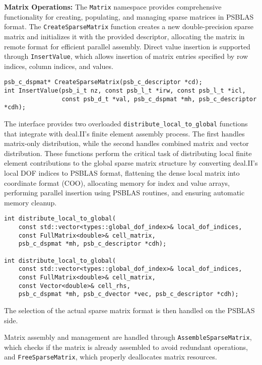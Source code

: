 \documentclass[a4paper,12pt]{article}
\begin{document}
\textbf{Matrix Operations:} The \texttt{Matrix} namespace provides comprehensive functionality 
for creating, populating, and managing sparse matrices in PSBLAS format. The \texttt{CreateSparseMatrix} 
function creates a new double-precision sparse matrix and initializes it with the provided descriptor, 
allocating the matrix in remote format for efficient parallel assembly. Direct value insertion is 
supported through \texttt{InsertValue}, which allows insertion of matrix entries specified by 
row indices, column indices, and values.
\begin{lstlisting}[caption=Matrix creation and value insertion]
psb_c_dspmat* CreateSparseMatrix(psb_c_descriptor *cd);
int InsertValue(psb_i_t nz, const psb_l_t *irw, const psb_l_t *icl, 
                const psb_d_t *val, psb_c_dspmat *mh, psb_c_descriptor *cdh);
\end{lstlisting}

The interface provides two overloaded \texttt{distribute\_local\_to\_global} functions that 
integrate with deal.II's finite element assembly process. The first handles matrix-only 
distribution, while the second handles combined matrix and vector distribution. These 
functions perform the critical task of distributing local finite element contributions 
to the global sparse matrix structure by converting deal.II's local DOF indices to PSBLAS format, 
flattening the dense local matrix into coordinate format (COO), allocating memory for index 
and value arrays, performing parallel insertion using PSBLAS routines, and ensuring 
automatic memory cleanup.
\begin{lstlisting}[caption=Local-to-global distribution functions]
int distribute_local_to_global(
    const std::vector<types::global_dof_index>& local_dof_indices,
    const FullMatrix<double>& cell_matrix,
    psb_c_dspmat *mh, psb_c_descriptor *cdh);

int distribute_local_to_global(
    const std::vector<types::global_dof_index>& local_dof_indices,
    const FullMatrix<double>& cell_matrix,
    const Vector<double>& cell_rhs,
    psb_c_dspmat *mh, psb_c_dvector *vec, psb_c_descriptor *cdh);
\end{lstlisting}
The selection of the actual sparse matrix format is then handled on the PSBLAS side.

Matrix assembly and management are handled through \texttt{AssembleSparseMatrix}, which 
checks if the matrix is already assembled to avoid redundant operations, 
and \texttt{FreeSparseMatrix}, which properly deallocates matrix resources.
\end{document}
